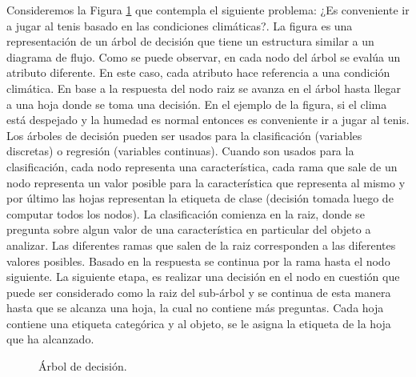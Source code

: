 	Consideremos la Figura \ref{fig: Arbol de decision} que contempla el siguiente problema: ¿Es conveniente ir a jugar al tenis basado en las condiciones climáticas?. La figura es una representación de un árbol de decisión que tiene un estructura similar a un diagrama de flujo. Como se puede observar, en cada nodo del árbol se evalúa un atributo diferente. En este caso, cada atributo hace referencia a una condición climática. En base a la respuesta del nodo raiz se avanza en el árbol hasta llegar a una hoja donde se toma una decisión. En el ejemplo de la figura, si el clima está despejado y la humedad es normal entonces es conveniente ir a jugar al tenis. Los árboles de decisión pueden ser usados para la clasificación (variables discretas) o regresión (variables continuas). Cuando son usados para la clasificación, cada nodo representa una característica, cada rama que sale de un nodo representa un valor posible para la característica que representa al mismo y por último las hojas representan la etiqueta de clase (decisión tomada luego de computar todos los nodos). La clasificación comienza en la raiz, donde se pregunta sobre algun valor de una característica en particular del objeto a analizar. Las diferentes ramas que salen de la  raiz corresponden a las diferentes valores posibles. Basado en la respuesta se continua por la rama hasta el nodo siguiente. La siguiente etapa, es realizar una decisión en el nodo en cuestión que puede ser considerado como la raiz del sub-árbol y se continua de esta manera hasta que se alcanza una hoja, la cual no contiene más preguntas. Cada hoja contiene una etiqueta categórica y al objeto, se le asigna la etiqueta de la hoja que ha alcanzado.
	
		\begin{figure}[htbp]
			\centering
			\caption{Árbol de decisión.}
			\label{fig: Arbol de decision}
		\end{figure}
		
